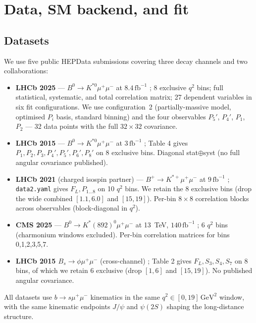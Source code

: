 \section{Data, SM backend, and fit}\label{sec:method}

\subsection{Datasets}

We use five public HEPData submissions covering three decay channels
and two collaborations:
\begin{itemize}
\item \textbf{LHCb 2025} — $B^{0}\!\to\!K^{*0}\mu^{+}\mu^{-}$ at
  $8.4\,\mathrm{fb}^{-1}$ \citep{LHCb2025BKstmumuComp,
  LHCb2025BKstmumuHEPData}; 8 exclusive $q^{2}$ bins; full statistical,
  systematic, and total correlation matrix; 27 dependent variables in
  six fit configurations. We use configuration~2 (partially-massive
  model, optimised $P_{i}$ basis, standard binning) and the four
  observables $P_{5}'$, $P_{4}'$, $P_{1}$, $P_{2}$ — 32 data points
  with the full $32{\times}32$ covariance.
\item \textbf{LHCb 2015} — $B^{0}\!\to\!K^{*0}\mu^{+}\mu^{-}$ at
  $3\,\mathrm{fb}^{-1}$ \citep{LHCb2015BKstmumu, LHCb2015HEPData};
  Table 4 gives $P_{1}, P_{2}, P_{3}, P_{4}', P_{5}', P_{6}', P_{8}'$
  on 8 exclusive bins. Diagonal stat$\oplus$syst (no full angular
  covariance published).
\item \textbf{LHCb 2021} (charged isospin partner) —
  $B^{+}\!\to\!K^{*+}\mu^{+}\mu^{-}$ at $9\,\mathrm{fb}^{-1}$
  \citep{LHCb2021BKstpmumu, LHCb2021HEPData}; \texttt{data2.yaml} gives
  $F_{L}, P_{1\dots 8}$ on 10 $q^{2}$ bins. We retain the 8 exclusive
  bins (drop the wide combined $[1.1,6.0]$ and $[15,19]$). Per-bin
  $8{\times}8$ correlation blocks across observables (block-diagonal
  in $q^{2}$).
\item \textbf{CMS 2025} — $B^{0}\!\to\!K^{*}(892)^{0}\mu^{+}\mu^{-}$
  at 13~TeV, $140\,\mathrm{fb}^{-1}$
  \citep{CMS2025BKstmumu, CMS2025HEPData}; 6 $q^{2}$ bins (charmonium
  windows excluded). Per-bin correlation matrices for bins 0,1,2,3,5,7.
\item \textbf{LHCb 2015 $B_{s}\!\to\!\phi\mu^{+}\mu^{-}$} (cross-channel)
  \citep{LHCb2015Bsphimumu, LHCb2015BsphiHEPData}; Table 2 gives
  $F_{L}, S_{3}, S_{4}, S_{7}$ on 8 bins, of which we retain 6
  exclusive (drop $[1,6]$ and $[15,19]$). No published angular
  covariance.
\end{itemize}
All datasets use $b\to s\mu^{+}\mu^{-}$ kinematics in the same
$q^{2}\in[0, 19]\,\mathrm{GeV}^{2}$ window, with the same kinematic
endpoints $J/\psi$ and $\psi(2S)$ shaping the long-distance structure.


